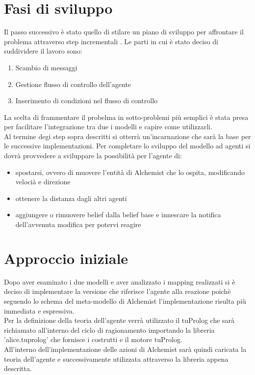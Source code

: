 \documentclass[12pt,a4paper,openright,twoside]{report}
\begin{document}
\section{Fasi di sviluppo}
Il passo successivo \`e stato quello di stilare un piano di sviluppo per affrontare il problema attraverso step incrementali . Le parti in cui \`e stato deciso di suddividere il lavoro sono:
\begin{enumerate}
   \item Scambio di messaggi
   \item Gestione flusso di controllo dell'agente
   \item Inserimento di condizioni nel flusso di controllo
\end{enumerate}

La scelta di frammentare il probelma in sotto-problemi pi\`u semplici \`e stata presa per facilitare l'integrazione tra due i modelli e capire come utilizzarli.
\\
Al termine degi step sopra descritti si otterr\`a un'incarnazione che sar\`a la base per le successive implementazioni. Per completare lo sviluppo del modello ad agenti si dovr\`a provvedere a sviluppare la possibilit\`a per l'agente di:
\begin{itemize}
   \item spostarsi, ovvero di muovere l'entit\`a di Alchemist che lo ospita, modificando veloci\`a e direzione
   \item ottenere la distanza dagli altri agenti
   \item aggiungere o rimuovere belief dalla belief base e innescare la notifica dell'avvenuta modifica per potervi reagire
\end{itemize}


\section{Approccio iniziale}

Dopo aver esaminato i due modelli e aver analizzato i mapping realizzati si \`e deciso di implementare la versione che riferisce l'agente alla reazione poich\`e seguendo lo schema del meta-modello di Alchemist l'implementazione risulta pi\`u immediata e espressiva.
\\
Per la definizione della teoria dell'agente verr\`a utilizzato il tuProlog che sar\`a richiamato all'interno del ciclo di ragionamento importando la libreria 'alice.tuprolog' che fornisce i costrutti e il motore tuProlog.
\\
All'interno dell'implementazione delle azioni di Alchemist sar\`a quindi caricata la teoria dell'agente e successivamente utilizzata attraverso la libreria appena descritta.
\end{document}
